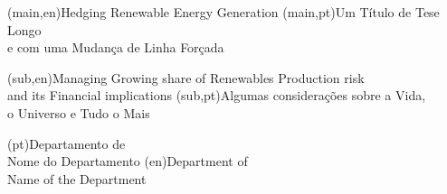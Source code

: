 
%


\nttitle(main,en){Hedging Renewable Energy Generation}%
\nttitle(main,pt){Um Título de Tese Longo\\e com uma Mudança de Linha Forçada}%

\nttitle(sub,en){Managing Growing share of Renewables Production risk\\ and its Financial implications}%
\nttitle(sub,pt){Algumas considerações sobre a Vida,\\o Universo e Tudo o Mais}%


\ntdepartment*(pt){Departamento de\\Nome do Departamento}
\ntdepartment*(en){Department of\\Name of the Department}

